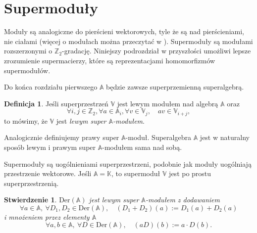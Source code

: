 \documentclass[11pt,a4paper]{report}
\newtheorem{proposition}[theorem]{Stwierdzenie}
\theoremstyle{definition}
\newtheorem{definition}[theorem]{Definicja}
\begin{document}
\section{Supermoduły}

Moduły są analogiczne do pierścieni wektorowych, tyle że są nad pierścieniami, nie ciałami (więcej o modułach można przeczytać w \cite{lang}). Supermoduły są modułami rozszerzonymi o $\mathbb{Z}_2$-gradację. Niniejszy podrozdział w przyszłości umożliwi lepsze zrozumienie supermacierzy, które są reprezentacjami homomorfizmów supermodułów. 

Do końca rozdziału pierwszego $\mathbb{A}$ będzie zawsze superprzemienną superalgebrą. 

\begin{definition}
	Jeśli superprzestrzeń $\mathbb{V}$ jest lewym modułem nad algebrą $\mathbb{A}$ oraz
	\begin{equation}
		\label{supermodule_definition}
		\forall i,j \in \mathbb{Z}_2, \forall a \in \mathbb{A}_i, \forall v \in \mathbb{V}_j,\quad av \in \mathbb{V}_{i+j},
	\end{equation}
	to mówimy, że $\mathbb{V}$ jest \textit{lewym super $\mathbb{A}$-modułem}.
	\label{supermodule}
\end{definition}

Analogicznie definiujemy  prawy super $\mathbb{A}$-moduł. Superalgebra $\mathbb{A}$ jest w naturalny sposób lewym i prawym super $\mathbb{A}$-modułem sama nad sobą. 

Supermoduły są uogólnieniami superprzestrzeni, podobnie jak moduły uogólniają przestrzenie wektorowe. Jeśli $\mathbb{A} = \mathbb{K}$, to supermoduł $\mathbb{V}$ jest po prostu superprzestrzenią.

\begin{proposition}
	\label{superdifferential_module}
	$\mathrm{Der}(\mathbb{A})$ jest lewym super $\mathbb{A}$-modułem z dodawaniem 
	\begin{equation*}
		\forall a \in \mathbb{A},\ \forall D_1, D_2 \in \mathrm{Der}(\mathbb{A}), \quad (D_1 + D_2)(a) := D_1(a) + D_2(a)
	\end{equation*}
	i mnożeniem przez elementy $\mathbb{A}$
	\begin{equation*}
		\forall a,b \in \mathbb{A},\ \forall D \in \mathrm{Der}(\mathbb{A}), \quad (aD)(b) := a \cdot D(b).
	\end{equation*}
\end{proposition}
\end{document}
